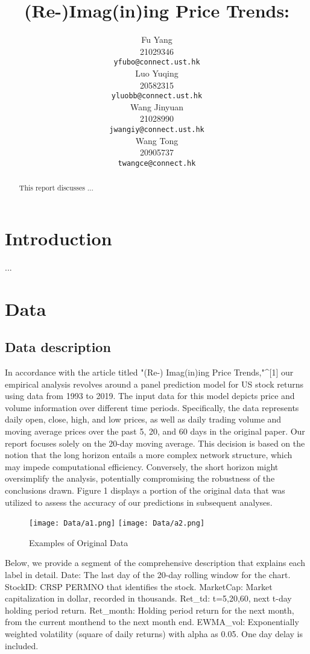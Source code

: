 \documentclass{article}
\title{(Re-)Imag(in)ing Price Trends:}
\author{%
  Fu Yang \\
  21029346\\
  \texttt{yfubo@connect.ust.hk} \\
  \And
  Luo Yuqing \\
  20582315\\
  \texttt{yluobb@connect.ust.hk} \\
  \AND
  Wang Jinyuan \\
  21028990\\
  \texttt{jwangiy@connect.ust.hk} \\
  \And
  Wang Tong \\
  20905737\\
  \texttt{twangce@connect.hk} \\
}
\begin{document}
\maketitle

\begin{abstract}
This report discusses ...

\end{abstract}

\section{Introduction}

...

\section{Data}
\subsection{Data description}

In accordance with the article titled "(Re-) Imag(in)ing Price Trends,"^{[1]} our empirical analysis revolves around a panel prediction model for US stock returns using data from 1993 to 2019. The input data for this model depicts price and volume information over different time periods. Specifically, the data represents daily open, close, high, and low prices, as well as daily trading volume and moving average prices over the past 5, 20, and 60 days in the original paper. Our report focuses solely on the 20-day moving average. This decision is based on the notion that the long horizon entails a more complex network structure, which may impede computational efficiency. Conversely, the short horizon might oversimplify the analysis, potentially compromising the robustness of the conclusions drawn. Figure 1 displays a portion of the original data that was utilized to assess the accuracy of our predictions in subsequent analyses.

\begin{figure}[H]
	\centering
	\texttt{[image: Data/a1.png]}
	\texttt{[image: Data/a2.png]}
	\caption{Examples of Original Data}
\end{figure}

Below, we provide a segment of the comprehensive description that explains each label in detail.
\textbullet Date: The last day of the 20-day rolling window for the chart.
\textbullet StockID: CRSP PERMNO that identifies the stock.
\textbullet MarketCap: Market capitalization in dollar, recorded in thousands.
\textbullet Ret_{t}d: t=5,20,60, next t-day holding period return.
\textbullet Ret_month: Holding period return for the next month, from the current monthend to the next month end.
\textbullet EWMA_vol: Exponentially weighted volatility (square of daily returns) with alpha as 0.05. One day delay is included.
\end{document}
